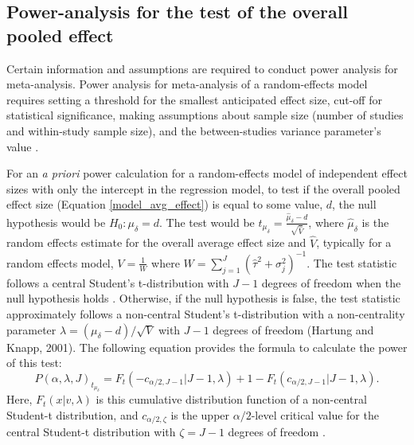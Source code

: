 \subsection{Power-analysis for the test of the overall pooled effect}


Certain information and assumptions are required to conduct power analysis for meta-analysis. Power analysis for meta-analysis of a random-effects model requires setting a threshold for the smallest anticipated effect size, cut-off for statistical significance, making assumptions about sample size (number of studies and within-study sample size), and the between-studies variance parameter's value \autocite{hedges2001}. 

For an \textit{a priori} power calculation for a random-effects model of independent effect sizes with only the intercept in the regression model, to test if the overall pooled effect size (Equation \ref{model_avg_effect}) is equal to some value, $d$, the null hypothesis would be $H_0: \mu_{\delta}=d$. The test would be $t_{\mu_{\delta}} = \frac{\hat{\mu}_{\delta}-d}{\sqrt{\hat{V}}}$,
 where $\hat{\mu}_{\delta}$ is the random effects estimate for the overall average effect size and $\hat{V}$, typically for a random effects model, $V = \frac{1}{W}$ where $W = \sum_{j=1}^J (\hat{\tau}^2 + \sigma^2_j)^{-1}$.  The test statistic follows a central Student's t-distribution with $J-1$ degrees of freedom when the null hypothesis holds \autocite{hedges2001, vembye2023}. Otherwise, if the null hypothesis is false, the test statistic approximately follows a non-central Student's t-distribution with a non-centrality parameter $\lambda = (\mu_{\delta} - d)/\sqrt{V}$ with $J-1$ degrees of freedom (Hartung and Knapp, 2001). The following equation provides the formula to calculate the power of this test:   
\begin{equation} \label{power-overall}
   P(\alpha, \lambda, J)_{t_{\mu_{\delta}}} =  F_t(-c_{\alpha/2, J-1}|J-1,\lambda) + 1- F_t(c_{\alpha/2, J-1}|J-1,\lambda).
\end{equation}
Here, $F_t(x|v,\lambda)$ is this cumulative distribution function of a non-central Student-t distribution, and $c_{\alpha/2,\zeta}$ is the upper $\alpha/2$-level critical value for the central Student-t distribution with $\zeta = J-1$ degrees of freedom \autocite{vembye2023, hedges2001}. 

